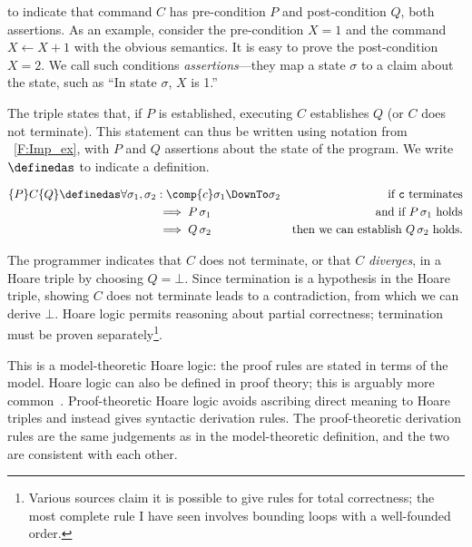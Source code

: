 to indicate that command \(C\) has pre-condition \(P\) and post-condition \(Q\),
both assertions. As an example, consider
the pre-condition \(X = 1\) and the command \(X \gets X + 1\) with the obvious
semantics. It is easy to prove the post-condition \(X = 2\). We call such
conditions \emph{assertions}---they map a state \(\sigma\) to a claim about the
state, such as ``In state \(\sigma\), \(X\) is 1.''

The triple states that, if \(P\) is established, executing \(C\) establishes
\(Q\) (or \(C\) does not terminate). This statement can thus be written using
notation from \figurename~\ref{F:Imp_ex}, with \(P\) and \(Q\) assertions about
the state of the program. We write \(\definedas\) to indicate a definition.

\begin{align*}
    \{P\} C \{Q\} \definedas \forall \sigma_1, \sigma_2 &: \comp{c}\sigma_1 \DownTo \sigma_2 &\text{if \(\mathtt{c}\) terminates} \\
    &\implies P\, \sigma_1 &\text{and if \(P\, \sigma_1\) holds} \\
    &\implies Q\, \sigma_2 &\text{then we can establish \(Q\, \sigma_2\) holds.}
\end{align*}

The programmer indicates that \(C\) does not terminate, or that \(C\)
\emph{diverges}, in a Hoare triple by choosing \(Q = \bot\). Since termination
is a hypothesis in the Hoare triple, showing \(C\) does not terminate leads to a
contradiction, from which we can derive \(\bot\). Hoare logic permits reasoning
about partial correctness; termination must be proven
separately\footnote{Various sources claim it is possible to give rules for total
correctness; the most complete rule I have seen involves bounding loops with a
well-founded order.}.

This is a model-theoretic Hoare logic: the proof rules are stated in terms of
the model. Hoare logic can also be defined in proof theory; this is arguably
more common~\cite[Ch.\ \emph{Hoare Logic as a Logic}]{Pierce:SF2}.
Proof-theoretic Hoare logic avoids ascribing direct meaning to Hoare triples and
instead gives syntactic derivation rules. The proof-theoretic derivation rules
are the same judgements as in the model-theoretic definition, and the two are
consistent with each other.

